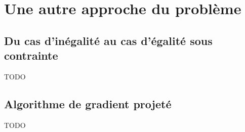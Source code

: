 \documentclass[10pt,a4paper]{article}
\begin{document}
\section{Une autre approche du problème}

\subsection{Du cas d'inégalité au cas d'égalité sous contrainte}
TODO

\subsection{Algorithme de gradient projeté}
TODO



\end{document}
